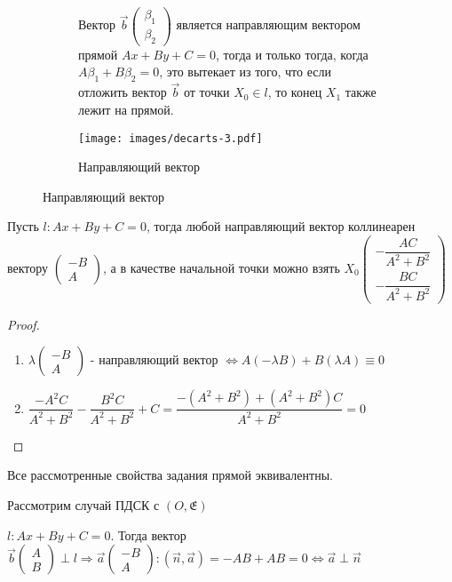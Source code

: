\begin{figure}[h]
	\begin{subfigure}[t!]{0.6\linewidth}
		\begin{corollary}
			Вектор \(\vec b\begin{pmatrix}
				\beta_1 \\ \beta_2
			\end{pmatrix}\) является направляющим вектором прямой \(Ax + By + C = 0\), тогда и только тогда, когда \(A\beta_1+B\beta_2 = 0\), это вытекает из того, что если отложить вектор $\vec{b}$ от точки \(X_0 \in l\), то конец \(X_1\) также лежит на прямой.
		\end{corollary}
	\end{subfigure}
	\begin{subfigure}[b!]{0.4\linewidth}
		\centering
		\texttt{[image: images/decarts-3.pdf]}
		\caption*{Направляющий вектор}
		\label{Decart3}
	\end{subfigure}
\end{figure}
\begin{theorem}
	Пусть \(l: Ax+By+C = 0\), тогда любой направляющий вектор коллинеарен вектору \(\begin{pmatrix}
		-B \\ A
	\end{pmatrix}\), а в качестве начальной точки можно взять \(X_0\begin{pmatrix}
		-\dfrac{AC}{A^2+B^2} \\ -\dfrac{BC}{A^2+B^2}
	\end{pmatrix}\)
\end{theorem}
\begin{proof}
	\begin{enumerate}
		\item \(\lambda \begin{pmatrix}
			-B \\ A
		\end{pmatrix}\) - направляющий вектор \(\Longleftrightarrow A(-\lambda B)+B(\lambda A) \equiv 0\)
		\item \(\dfrac{-A^2C}{A^2+B^2} - \dfrac{B^2C}{A^2+B^2}+C = \dfrac{-(A^2+B^2) + (A^2+B^2)C}{A^2+B^2} = 0\)
	\end{enumerate}
\end{proof}
\begin{corollary}
	Все рассмотренные свойства задания прямой эквивалентны.
\end{corollary}
Рассмотрим случай ПДСК с \((O, \mathfrak{E})\)
\begin{proposition}
	\(l: Ax+By+C = 0\). Тогда вектор \(\vec b\begin{pmatrix}
		A \\ B
	\end{pmatrix}\perp l \Longrightarrow \vec{a}\begin{pmatrix}
		-B \\ A
	\end{pmatrix}: (\vec n, \vec a) = -AB + AB = 0\Longleftrightarrow \vec a\perp \vec n\)
\end{proposition}

